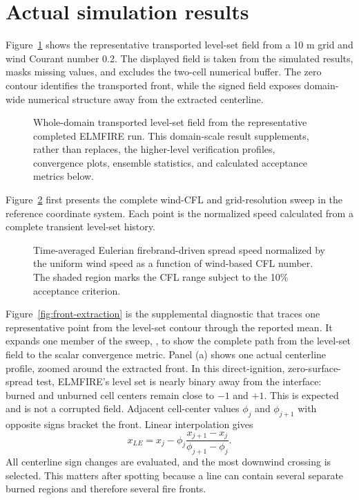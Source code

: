 \section{Actual simulation results}

Figure~\ref{fig:domain-result} shows the representative transported level-set field from a 10 m grid and wind Courant number 0.2.
The displayed field is taken from the simulated results, masks missing values, and excludes
the two-cell numerical buffer.  The zero contour identifies the transported front, while the signed field exposes domain-wide numerical structure away from the extracted centerline.

\begin{figure}[H]
\centering
{}
\caption{Whole-domain transported level-set field from the representative completed ELMFIRE run.  This
domain-scale result supplements, rather than replaces, the higher-level verification
profiles, convergence plots, ensemble statistics, and calculated acceptance metrics below.}
\label{fig:domain-result}
\end{figure}

Figure~\ref{fig:transport-convergence} first presents the complete wind-CFL
and grid-resolution sweep in the reference coordinate system. Each point is
the normalized speed calculated from a complete transient level-set history.
\begin{figure}[H]
  \centering
  \caption{Time-averaged Eulerian firebrand-driven spread speed normalized by
  the uniform wind speed as a function of wind-based CFL number. The shaded
  region marks the CFL range subject to the 10\% acceptance criterion.}
  \label{fig:transport-convergence}
\end{figure}

Figure~\ref{fig:front-extraction} is the supplemental diagnostic that traces
one representative point from the level-set contour through the reported mean.
It expands one member of the sweep,
\texttt{}, to show the complete path from the
level-set field to the scalar convergence metric.  Panel (a) shows one actual
centerline profile, zoomed around the extracted front.  In this direct-ignition,
zero-surface-spread test, ELMFIRE's level set is nearly binary away from the
interface: burned and unburned cell centers remain close to $-1$ and $+1$.
This is expected and is not a corrupted field.  Adjacent cell-center values
$\phi_j$ and $\phi_{j+1}$ with opposite signs bracket the front.  Linear
interpolation gives
\begin{equation}
 x_{LE}=x_j-\phi_j\frac{x_{j+1}-x_j}{\phi_{j+1}-\phi_j}.
\end{equation}
All centerline sign changes are evaluated, and the most downwind crossing is
selected.  This matters after spotting because a line can contain several
separate burned regions and therefore several fire fronts.

